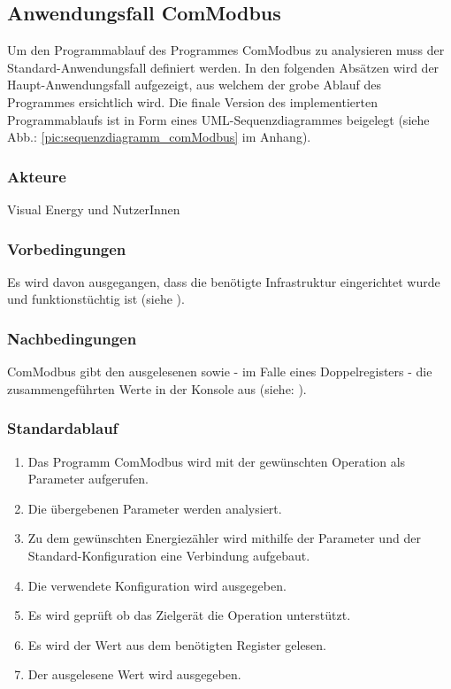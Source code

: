 \documentclass[Bachelorarbeit.tex]{subfiles}
\begin{document}
\subsection{Anwendungsfall ComModbus}
Um den Programmablauf des Programmes ComModbus zu analysieren muss der Standard-Anwendungsfall definiert werden. 
In den folgenden Absätzen wird der Haupt-Anwendungsfall aufgezeigt, aus welchem der grobe Ablauf des Programmes ersichtlich wird. 
Die finale Version des implementierten Programmablaufs ist in Form eines UML-Sequenzdiagrammes beigelegt (siehe Abb.: \ref{pic:sequenzdiagramm_comModbus} im Anhang).

\subsubsection*{Akteure}
Visual Energy und NutzerInnen

\subsubsection*{Vorbedingungen}
Es wird davon ausgegangen, dass die benötigte Infrastruktur eingerichtet wurde und 
funktionstüchtig ist (siehe ).

\subsubsection*{Nachbedingungen}
ComModbus gibt den ausgelesenen sowie - im Falle eines Doppelregisters - die zusammengeführten Werte in der 
Konsole aus (siehe: ).

\subsubsection*{Standardablauf}
\begin{enumerate} %
\item Das Programm ComModbus wird mit der gewünschten Operation als
Parameter aufgerufen.
\item Die übergebenen Parameter werden analysiert.
\item \label{uc:3} Zu dem gewünschten Energiezähler wird mithilfe der Parameter und der 
Standard-Konfiguration eine Verbindung aufgebaut.
\item Die verwendete Konfiguration wird ausgegeben.
\item Es wird geprüft ob das Zielgerät die Operation unterstützt.
\item Es wird der Wert aus dem benötigten Register gelesen.
\item \label{uc:7} Der ausgelesene Wert wird ausgegeben.
\end{enumerate}
\end{document}
